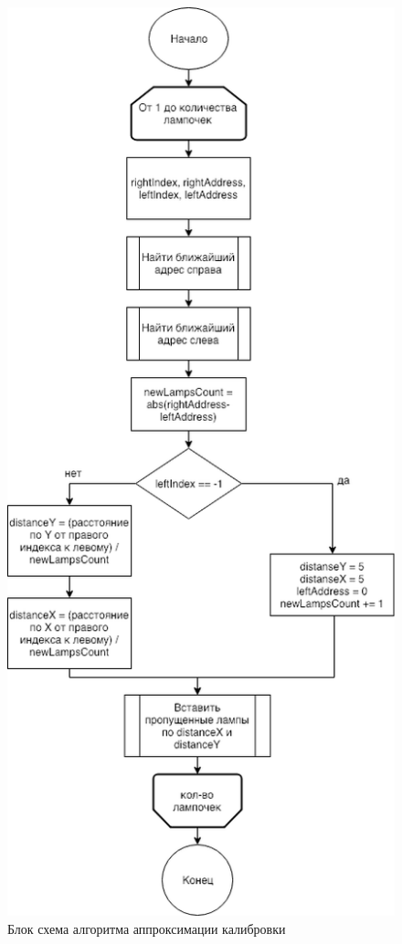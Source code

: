 \newpage
{}
\label{app:algorithms}

~
\begin{figure}[H]
\centering
	\includegraphics[scale=0.5]{figures/approximation.png}
	\caption{Блок схема алгоритма аппроксимации калибровки}
	\label{fig:appendices:algorithms:approximation}
\end{figure}
